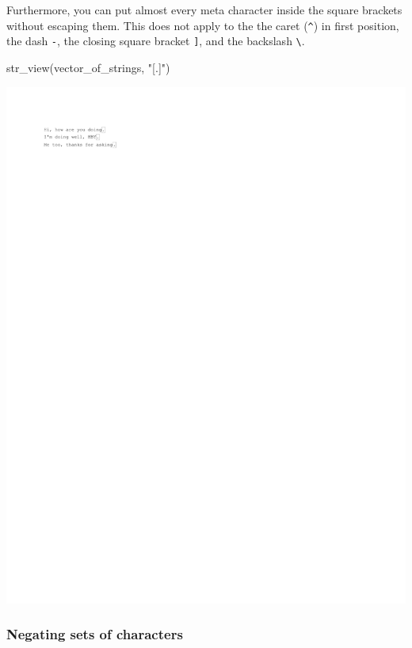 \documentclass[
]{book}
\newenvironment{Shaded}{\begin{snugshade}}{\end{snugshade}}
\newcommand{\FunctionTok}[1]{\textcolor[rgb]{0.00,0.00,0.00}{#1}}
\newcommand{\NormalTok}[1]{#1}
\newcommand{\StringTok}[1]{\textcolor[rgb]{0.31,0.60,0.02}{#1}}
\begin{document}
Furthermore, you can put almost every meta character inside the square brackets without escaping them. This does not apply to the the caret (\texttt{\^{}}) in first position, the dash \texttt{-}, the closing square bracket \texttt{{]}}, and the backslash \texttt{\textbackslash{}}.

\begin{Shaded}
\begin{Highlighting}[]
\FunctionTok{str\_view}\NormalTok{(vector\_of\_strings, }\StringTok{"[.]"}\NormalTok{)}
\end{Highlighting}
\end{Shaded}

\includegraphics{_main_files/figure-latex/unnamed-chunk-31-1.pdf}

\hypertarget{negating-sets-of-characters}{%
\subsubsection{Negating sets of characters}\label{negating-sets-of-characters}}
\end{document}
